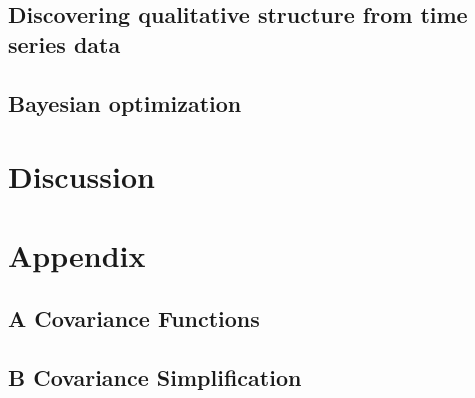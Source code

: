 \documentclass[twoside,11pt]{article}
\newcommand{\gpmem}{\texttt{gpmem}}
\begin{document}
\subsection{Discovering qualitative structure from time series data}\label{sec:structurelearning}


\subsection{Bayesian optimization}

\label{sec:thompson}




%
%
%
\section{Discussion}


\newpage
\section*{Appendix}
\subsection*{A Covariance Functions}


\subsection*{B Covariance Simplification}


%

\newpage


\end{document}
